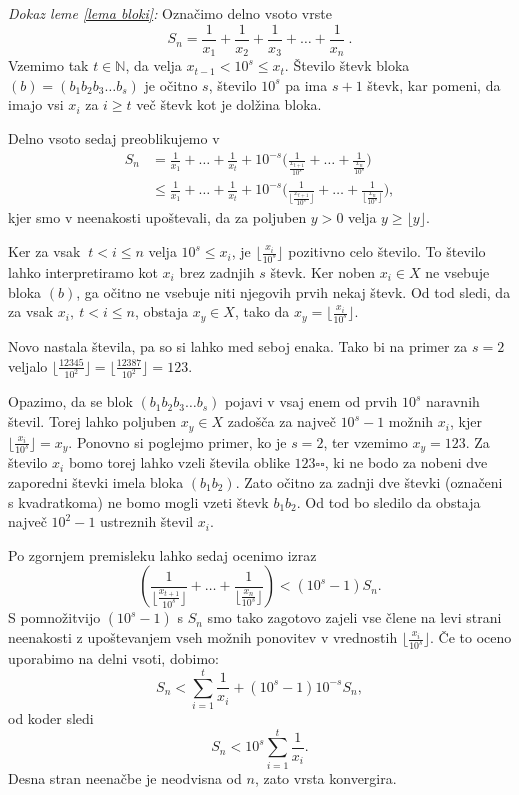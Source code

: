 \documentclass[a4paper,12pt]{article}
\def\N{\mathbb{N}} %
\begin{document}
\noindent
{\em Dokaz leme \ref{lema bloki}:\/} 
Označimo delno vsoto vrste 
\[ S_n = \frac{1}{x_1} + \frac{1}{x_2} + \frac{1}{x_3} + \dots + \frac{1}{x_n} \ . \]
Vzemimo tak $t \in \N $, da velja $x_{t-1} < 10^s \leq x_t$. Število števk bloka $(b) = (b_1b_2b_3 \dots b_s)$
je očitno $s$, število $10^s$ pa ima $s+1$ števk, kar pomeni, da imajo vsi $x_i$ za $i \geq t$
več števk kot je dolžina bloka. 

Delno vsoto sedaj preoblikujemo v
\[ 
    \begin{split}
        S_n &= \frac{1}{x_1} + \dots + \frac{1}{x_t} + 10^{-s}\bigg(\frac{1}{\frac{x_{t + 1}}{10^s}} + \dots + \frac{1}{\frac{x_n}{10^s}}\bigg) \\
        &\leq \frac{1}{x_1} + \dots + \frac{1}{x_t} + 10^{-s}\bigg(\frac{1}{ \lfloor\frac{x_{t + 1}}{10^s}\rfloor} + \dots + \frac{1}{\lfloor\frac{x_n}{10^s}\rfloor}\bigg) ,
    \end{split}
     \]
kjer smo v neenakosti upoštevali, da za poljuben $y > 0$ velja $y \geq \lfloor y \rfloor$.

Ker za vsak $\ t < i \leq n$ velja $10^s \leq x_i$, je $\lfloor \frac{x_i}{10^s} \rfloor$ pozitivno celo število.
To število lahko interpretiramo kot $x_i$ brez zadnjih $s$ števk. 
Ker noben $x_i \in X$ ne vsebuje bloka $(b)$, 
ga očitno ne vsebuje niti njegovih prvih nekaj števk. 
Od tod sledi, da za vsak $x_i, \ t < i \leq n$, obstaja $x_y \in X$,
tako da $ x_y = \lfloor \frac{x_i}{10^s} \rfloor$.

Novo nastala števila, pa so si lahko med seboj enaka. Tako bi na primer za $s=2$ veljalo 
$ \lfloor\frac{12345}{10^2}\rfloor = \lfloor \frac{12387}{10^2}\rfloor = 123$.

Opazimo, da se blok $(b_1b_2b_3 \dots b_s)$ pojavi v vsaj enem od prvih $10^s$ naravnih števil.
Torej lahko poljuben $x_y \in X$ zadošča za največ $10^s - 1$ možnih $x_i$, kjer $\lfloor \frac{x_i}{10^s} \rfloor = x_y$.
%
Ponovno si poglejmo primer, ko je $s=2$, ter vzemimo $x_y = 123$. Za število $x_i$ bomo torej lahko vzeli števila oblike $123 \square \square$,
ki ne bodo za nobeni dve zaporedni števki imela bloka $(b_1b_2)$. 
Zato očitno za zadnji dve števki (označeni s kvadratkoma) ne bomo mogli vzeti števk $b_1b_2$. 
Od tod bo sledilo da obstaja največ $10^2 - 1$ ustreznih števil $x_i$.

Po zgornjem premisleku lahko sedaj ocenimo izraz 
\[(\frac{1}{ \lfloor\frac{x_{t + 1}}{10^s}\rfloor} + \dots + \frac{1}{\lfloor\frac{x_n}{10^s}\rfloor}) < (10^s - 1)S_n.\]
S pomnožitvijo $(10^s - 1)$ s $S_n$ smo tako zagotovo zajeli vse člene na levi strani neenakosti
z upoštevanjem vseh možnih ponovitev v vrednostih $\lfloor\frac{x_i}{10^s}\rfloor$.
Če to oceno uporabimo na delni vsoti, dobimo:
\[
    S_n < \sum_{i=1}^t \frac{1}{x_i} + (10^s - 1)10^{-s}S_n,
\] 
od koder sledi
\[
    S_n < 10^s \sum_{i=1}^t \frac{1}{x_i}.
\]
Desna stran neenačbe je neodvisna od $n$, zato vrsta konvergira.
\end{document}
